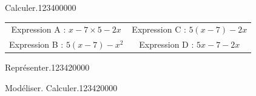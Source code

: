 \begin{pageParcoursd}
\begin{ExoCd}{Calculer.}{1234}{0}{0}{0}{0}{0}
\begin{enumerate}
\begin{tabular}{cc}

Expression A : $x-7 \times 5-2x$ &Expression C : $5(x-7)-2x$ \\
Expression B : $5(x -7)- x^2$& Expression D : $5x-7-2x$\\
\end{tabular} 

\end{enumerate}

\end{ExoCd} 
 
 
 
\end{pageParcoursd}

\begin{pageParcourst}

\begin{ExoCt}{Représenter.}{1234}{2}{0}{0}{0}{0}

 
 
 
\end{ExoCt}

\begin{ExoCt}{Modéliser. Calculer.}{1234}{2}{0}{0}{0}{0}
 
 
 
 

\end{ExoCt}
 

 
\end{pageParcourst}






